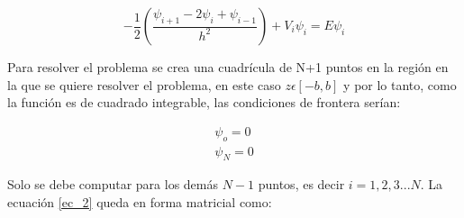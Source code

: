 \documentclass[a4paper]{article}
\theoremstyle{definition}
\theoremstyle{plain}
\begin{document}
\begin{equation}
    -\frac{1}{2} \left (\frac{\psi_{i+1} - 2 \psi_i + \psi_{i-1}}{h^2} \right) + V_i\psi_i = E \psi_i
    \label{ec_2}
\end{equation}

Para resolver el problema se crea una cuadrícula de N+1 puntos en la región en la que se quiere resolver el problema, en este caso $z \epsilon [-b, b]$ y por lo tanto, como la función es de cuadrado integrable, las condiciones de frontera serían:

\begin{align*}
    \psi_o = 0 \\
    \psi_N = 0
\end{align*}

Solo se debe computar para los demás $N-1$ puntos, es decir $i = 1,2,3 ... N$. La ecuación \ref{ec_2} queda en forma matricial como:
\end{document}
